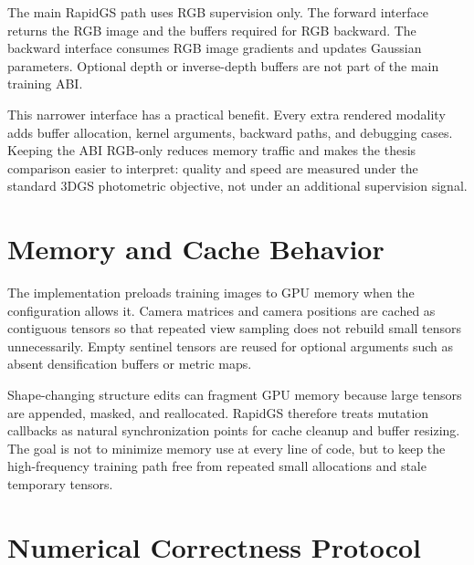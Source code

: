 The main RapidGS path uses RGB supervision only. The forward interface returns the RGB image and the buffers required for RGB backward. The backward interface consumes RGB image gradients and updates Gaussian parameters. Optional depth or inverse-depth buffers are not part of the main training ABI.

This narrower interface has a practical benefit. Every extra rendered modality adds buffer allocation, kernel arguments, backward paths, and debugging cases. Keeping the ABI RGB-only reduces memory traffic and makes the thesis comparison easier to interpret: quality and speed are measured under the standard 3DGS photometric objective, not under an additional supervision signal.

\section{Memory and Cache Behavior}

The implementation preloads training images to GPU memory when the configuration allows it. Camera matrices and camera positions are cached as contiguous tensors so that repeated view sampling does not rebuild small tensors unnecessarily. Empty sentinel tensors are reused for optional arguments such as absent densification buffers or metric maps.

Shape-changing structure edits can fragment GPU memory because large tensors are appended, masked, and reallocated. RapidGS therefore treats mutation callbacks as natural synchronization points for cache cleanup and buffer resizing. The goal is not to minimize memory use at every line of code, but to keep the high-frequency training path free from repeated small allocations and stale temporary tensors.

\section{Numerical Correctness Protocol}


